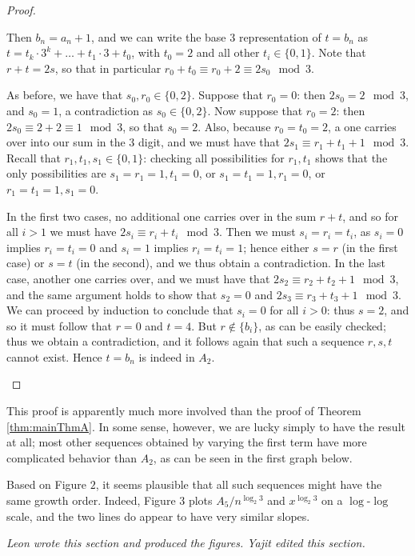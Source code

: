 \documentclass[11pt,letterpaper,twoside,english]{article}
\theoremstyle{theorem}
\theoremstyle{remark}
\begin{document}
\begin{proof}
\begin{itemize}
Then $b_n=a_n+1$, and we can write the base 3 representation of $t=b_n$ as $t=t_k\cdot 3^k+\ldots + t_1\cdot 3 + t_0$, with $t_0=2$ and all other $t_i\in \{0,1\}$. Note that $r+t=2s$, so that in particular $r_0+t_0\equiv r_0+2\equiv 2s_0\mod 3$.

As before, we have that $s_0, r_0\in \{0, 2\}$. Suppose that $r_0=0$: then $2s_0=2\mod 3$, and $s_0=1$, a contradiction as $s_0\in \{0, 2\}$. Now suppose that $r_0=2$: then $2s_0\equiv 2+2\equiv 1\mod 3$, so that $s_0=2$. Also, because $r_0=t_0=2$, a one carries over into our sum in the 3 digit, and we must have that $2s_1\equiv r_1+t_1+1\mod 3$. Recall that $r_1, t_1,s_1\in \{0,1\}$: checking all possibilities for $r_1,t_1$ shows that the only possibilities are $s_1=r_1=1, t_1=0$, or $s_1=t_1=1, r_1=0$, or $r_1=t_1=1, s_1=0$. 

In the first two cases, no additional one carries over in the sum $r+t$, and so for all $i>1$ we must have $2s_i\equiv r_i+t_i\mod 3$. Then we must $s_i=r_i=t_i$, as $s_i=0$ implies $r_i=t_i=0$ and $s_i=1$ implies $r_i=t_i=1$; hence either $s=r$ (in the first case) or $s=t$ (in the second), and we thus obtain a contradiction. In the last case, another one carries over, and we must have that $2s_2\equiv r_2+t_2+1\mod 3$, and the same argument holds to show that $s_2=0$ and $2s_3\equiv r_3+t_3+1\mod 3$. We can proceed by induction to conclude that $s_i=0$ for all $i>0$: thus $s=2$, and so it must follow that $r=0$ and $t=4$. But $r\not\in \{b_i\}$, as can be easily checked; thus we obtain a contradiction, and it follows again that such a sequence $r, s, t$ cannot exist. Hence $t=b_n$ is indeed in $A_2$.
\end{itemize}\end{proof}
This proof is apparently much more involved than the proof of Theorem \ref{thm:mainThmA}. In some sense, however, we are lucky simply to have the result at all; most other sequences obtained by varying the first term have more complicated behavior than $A_2$, as can be seen in the first graph below. 

Based on Figure $2$, it seems plausible that all such sequences might have the same growth order. Indeed, Figure 3 plots $A_5/n^{\log_2 3}$ and $x^{\log_2 3}$ on a $\log$-$\log$ scale, and the two lines do appear to have very similar slopes.

\emph{Leon wrote this section and produced the figures. Yajit edited this section.}
\end{document}
